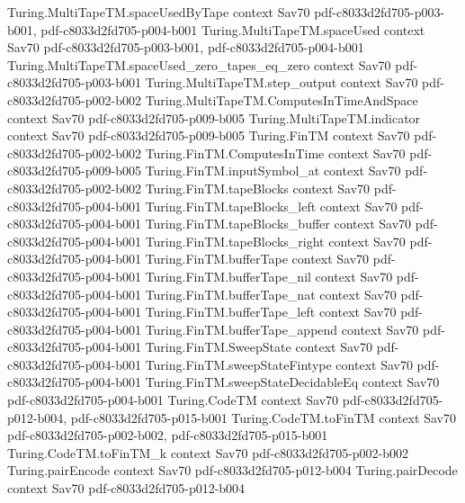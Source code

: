 \begin{theorem}
\proofstep
  {Turing.MultiTapeTM.spaceUsedByTape}
  {context}
  {Sav70}
  {pdf-c8033d2fd705-p003-b001,
    pdf-c8033d2fd705-p004-b001}
\proofstep
  {Turing.MultiTapeTM.spaceUsed}
  {context}
  {Sav70}
  {pdf-c8033d2fd705-p003-b001,
    pdf-c8033d2fd705-p004-b001}
\proofstep
  {Turing.MultiTapeTM.spaceUsed_zero_tapes_eq_zero}
  {context}
  {Sav70}
  {pdf-c8033d2fd705-p003-b001}
\proofstep
  {Turing.MultiTapeTM.step_output}
  {context}
  {Sav70}
  {pdf-c8033d2fd705-p002-b002}
\proofstep
  {Turing.MultiTapeTM.ComputesInTimeAndSpace}
  {context}
  {Sav70}
  {pdf-c8033d2fd705-p009-b005}
\proofstep
  {Turing.MultiTapeTM.indicator}
  {context}
  {Sav70}
  {pdf-c8033d2fd705-p009-b005}
\proofstep
  {Turing.FinTM}
  {context}
  {Sav70}
  {pdf-c8033d2fd705-p002-b002}
\proofstep
  {Turing.FinTM.ComputesInTime}
  {context}
  {Sav70}
  {pdf-c8033d2fd705-p009-b005}
\proofstep
  {Turing.FinTM.inputSymbol_at}
  {context}
  {Sav70}
  {pdf-c8033d2fd705-p002-b002}
\proofstep
  {Turing.FinTM.tapeBlocks}
  {context}
  {Sav70}
  {pdf-c8033d2fd705-p004-b001}
\proofstep
  {Turing.FinTM.tapeBlocks_left}
  {context}
  {Sav70}
  {pdf-c8033d2fd705-p004-b001}
\proofstep
  {Turing.FinTM.tapeBlocks_buffer}
  {context}
  {Sav70}
  {pdf-c8033d2fd705-p004-b001}
\proofstep
  {Turing.FinTM.tapeBlocks_right}
  {context}
  {Sav70}
  {pdf-c8033d2fd705-p004-b001}
\proofstep
  {Turing.FinTM.bufferTape}
  {context}
  {Sav70}
  {pdf-c8033d2fd705-p004-b001}
\proofstep
  {Turing.FinTM.bufferTape_nil}
  {context}
  {Sav70}
  {pdf-c8033d2fd705-p004-b001}
\proofstep
  {Turing.FinTM.bufferTape_nat}
  {context}
  {Sav70}
  {pdf-c8033d2fd705-p004-b001}
\proofstep
  {Turing.FinTM.bufferTape_left}
  {context}
  {Sav70}
  {pdf-c8033d2fd705-p004-b001}
\proofstep
  {Turing.FinTM.bufferTape_append}
  {context}
  {Sav70}
  {pdf-c8033d2fd705-p004-b001}
\proofstep
  {Turing.FinTM.SweepState}
  {context}
  {Sav70}
  {pdf-c8033d2fd705-p004-b001}
\proofstep
  {Turing.FinTM.sweepStateFintype}
  {context}
  {Sav70}
  {pdf-c8033d2fd705-p004-b001}
\proofstep
  {Turing.FinTM.sweepStateDecidableEq}
  {context}
  {Sav70}
  {pdf-c8033d2fd705-p004-b001}
\proofstep
  {Turing.CodeTM}
  {context}
  {Sav70}
  {pdf-c8033d2fd705-p012-b004,
    pdf-c8033d2fd705-p015-b001}
\proofstep
  {Turing.CodeTM.toFinTM}
  {context}
  {Sav70}
  {pdf-c8033d2fd705-p002-b002,
    pdf-c8033d2fd705-p015-b001}
\proofstep
  {Turing.CodeTM.toFinTM_k}
  {context}
  {Sav70}
  {pdf-c8033d2fd705-p002-b002}
\proofstep
  {Turing.pairEncode}
  {context}
  {Sav70}
  {pdf-c8033d2fd705-p012-b004}
\proofstep
  {Turing.pairDecode}
  {context}
  {Sav70}
  {pdf-c8033d2fd705-p012-b004}

\end{theorem}

